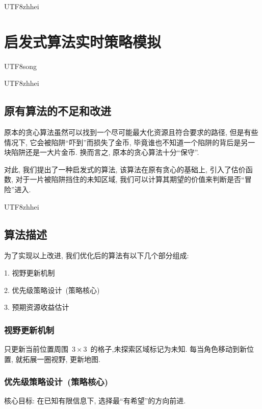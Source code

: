 \documentclass[10.5pt,compsoc]{CjC}
\theoremstyle{mystyle}
\begin{document}
\begin{CJK*}{UTF8}{zhhei}
\vskip 1mm
\section{启发式算法实时策略模拟}
\end{CJK*}

\begin{CJK*}{UTF8}{song}
    
\begin{CJK*}{UTF8}{zhhei}\subsection{原有算法的不足和改进}\end{CJK*}

原本的贪心算法虽然可以找到一个尽可能最大化资源且符合要求的路径,
但是有些情况下, 它会被陷阱“吓到”而损失了金币,
毕竟谁也不知道一个陷阱的背后是另一块陷阱还是一大片金币.
换而言之, 原本的贪心算法十分“保守”.

对此, 我们提出了一种启发式的算法,
该算法在原有贪心的基础上, 引入了估价函数,
对于一片被陷阱挡住的未知区域, 我们可以计算其期望的价值来判断是否“冒险”进入.

    
\begin{CJK*}{UTF8}{zhhei}\subsection{算法描述}\end{CJK*}

为了实现以上改进, 我们优化后的算法有以下几个部分组成:

1. 视野更新机制

2. 优先级策略设计~(策略核心)

3. 预期资源收益估计

\subsubsection{视野更新机制}

只更新当前位置周围~$3 \times 3$~的格子,未探索区域标记为未知.
每当角色移动到新位置, 就拓展一圈视野, 更新地图.

\subsubsection{优先级策略设计~(策略核心)}

核心目标: 在已知有限信息下, 选择最“有希望”的方向前进.


\end{CJK*}
\end{document}
